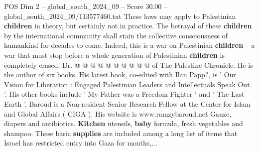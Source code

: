 \begin{textsample}{POS Dim 2 – global\_south\_2024\_09 – Score 30.00 – global\_south\_2024\_09/113577460.txt}
These laws may apply to Palestinian \textbf{children} in theory, but certainly not in practice.
The betrayal of these \textbf{children} by the international community shall stain the collective consciousness of humankind for decades to come.
Indeed, this is a war on Palestinian \textbf{children} -- a war that must stop before a whole generation of Palestinian \textbf{children} is completely erased.
Dr. @ @ @ @ @ @ @ @ @ @ of The Palestine Chronicle.
He is the author of six books.
His latest book, co-edited with Ilan Papp?, is ' Our Vision for Liberation : Engaged Palestinian Leaders and Intellectuals Speak Out '.
His other books include ' My Father was a Freedom Fighter ' and ' The Last Earth '.
Baroud is a Non-resident Senior Research Fellow at the Center for Islam and Global Affairs ( CIGA ).
His website is www.ramzybaroud.net Gauze, diapers and antibiotics. \textbf{Kitchen} utensils, \textbf{baby} formula, fresh vegetables and shampoo.
These basic \textbf{supplies} are included among a long list of items that Israel has restricted entry into Gaza for months,...

\end{textsample}
